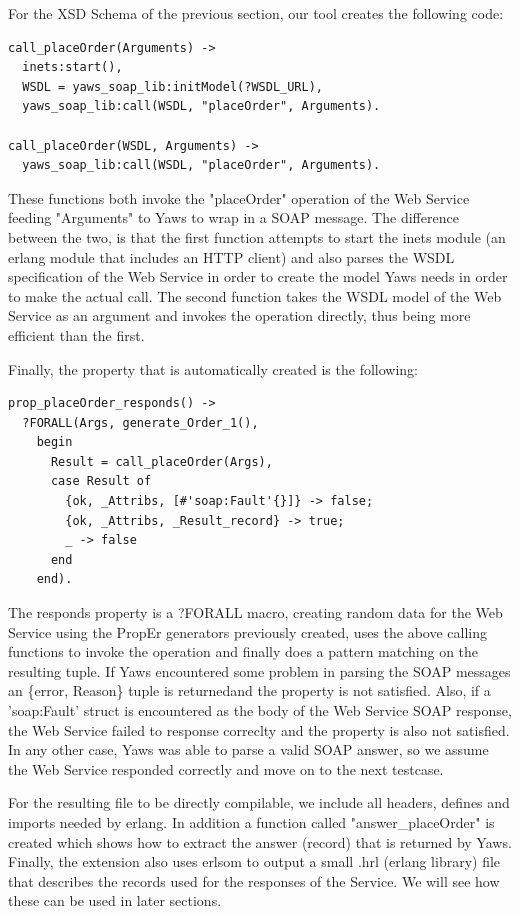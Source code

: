 \documentclass[submission,copyright,a4]{eptcs}
\begin{document}
For the XSD Schema of the previous section, our tool creates the following code:

\begin{lstlisting}
call_placeOrder(Arguments) ->
  inets:start(),
  WSDL = yaws_soap_lib:initModel(?WSDL_URL),
  yaws_soap_lib:call(WSDL, "placeOrder", Arguments).
    
call_placeOrder(WSDL, Arguments) ->
  yaws_soap_lib:call(WSDL, "placeOrder", Arguments).
\end{lstlisting}

These functions both invoke the "placeOrder" operation of the Web Service feeding "Arguments" to Yaws to wrap in a SOAP message. The difference between the two, is that the first function attempts to start the inets module (an erlang module that includes an HTTP client) and also parses the WSDL specification of the Web Service in order to create the model Yaws needs in order to make the actual call. The second function takes the WSDL model of the Web Service as an argument and invokes the operation directly, thus being more efficient than the first.

Finally, the property that is automatically created is the following:

\begin{lstlisting}
prop_placeOrder_responds() ->
  ?FORALL(Args, generate_Order_1(),
    begin
      Result = call_placeOrder(Args),
      case Result of 
        {ok, _Attribs, [#'soap:Fault'{}]} -> false;
        {ok, _Attribs, _Result_record} -> true;
        _ -> false
      end
    end).
\end{lstlisting}

The responds property is a ?FORALL macro, creating random data for the Web Service using the PropEr generators previously created, uses the above calling functions to invoke the operation and finally does a pattern matching on the resulting tuple. If Yaws encountered some problem in parsing the SOAP messages an \{error, Reason\} tuple is returnedand the property is not satisfied. Also, if a 'soap:Fault' struct is encountered as the body of the Web Service SOAP response, the Web Service failed to response correclty and the property is also not satisfied. In any other case, Yaws was able to parse a valid SOAP answer, so we assume the Web Service responded correctly and move on to the next testcase.

For the resulting file to be directly compilable, we include all headers, defines and imports needed by erlang. In addition a function called "answer\_placeOrder" is created which shows how to extract the answer (record) that is returned by Yaws. Finally, the extension also uses erlsom to output a small .hrl (erlang library) file that describes the records used for the responses of the Service. We will see how these can be used in later sections.
\end{document}
